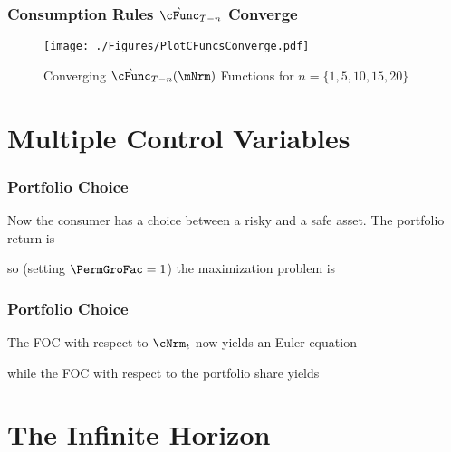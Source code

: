 \documentclass{beamer}
\begin{document}
\begin{frame}%
\frametitle{Consumption Rules $\grave{\cFunc}_{T-n}$ Converge}

\begin{figure}
        \texttt{[image: ./Figures/PlotCFuncsConverge.pdf]}
        \caption{Converging $\grave{\cFunc}_{T-n}(\mNrm)$ Functions for $n=\{1,5,10,15,20\}$}
        \label{fig:PlotCFuncsConverge}
\end{figure}

\end{frame}


\section{Multiple Control Variables}
\begin{frame}
\frametitle{Portfolio Choice}

Now the consumer has a choice between a risky and a safe asset.  \pause The portfolio
return is

\pause so (setting $\PermGroFac=1$) the maximization problem is \pause 


\end{frame}

\begin{frame}
\frametitle{Portfolio Choice}

The FOC with respect to $\cNrm_{t}$ now yields an Euler equation

\pause
while the FOC with respect to the portfolio share yields


\end{frame}

\section{The Infinite Horizon}
\end{document}
